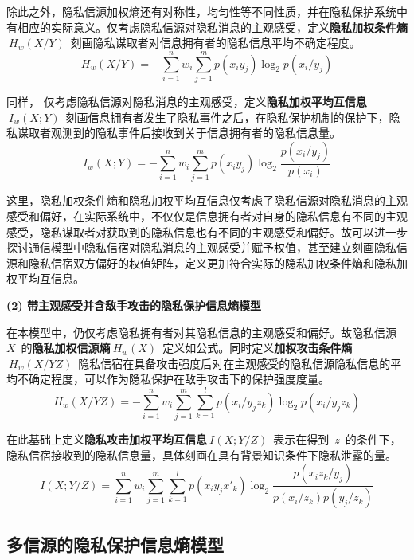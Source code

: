除此之外，隐私信源加权熵还有对称性，均匀性等不同性质，并在隐私保护系统中有相应的实际意义。仅考虑隐私信源对隐私消息的主观感受，定义\textbf{隐私加权条件熵}$~H_{w}(X/Y)$~刻画隐私谋取者对信息拥有者的隐私信息平均不确定程度。
\begin{equation}
H_{w}(X/Y)=-\sum_{i=1}^{n}w_{i}\sum_{j=1}^{m}p(x_{i}y_{j})\log_{2}p(x_{i}/y_{j})
\end{equation}

同样， 仅考虑隐私信源对隐私消息的主观感受，定义\textbf{隐私加权平均互信息}$~I_{w}(X;Y)$~刻画信息拥有者发生了隐私事件之后，在隐私保护机制的保护下，隐私谋取者观测到的隐私事件后接收到关于信息拥有者的隐私信息量。
\begin{equation}
I_{w}(X;Y)=-\sum_{i=1}^{n}w_{i}\sum_{j=1}^{m}p(x_{i}y_{j})\log_{2}\frac{p(x_{i}/y_{j})}{p(x_{i})}
\end{equation}

这里，隐私加权条件熵和隐私加权平均互信息仅考虑了隐私信源对隐私消息的主观感受和偏好，在实际系统中，不仅仅是信息拥有者对自身的隐私信息有不同的主观感受，隐私谋取者对获取到的隐私信息也有不同的主观感受和偏好。故可以进一步探讨通信模型中隐私信宿对隐私消息的主观感受并赋予权值，甚至建立刻画隐私信源和隐私信宿双方偏好的权值矩阵，定义更加符合实际的隐私加权条件熵和隐私加权平均互信息。

\textbf{(2) 带主观感受并含敌手攻击的隐私保护信息熵模型}

在本模型中，仍仅考虑隐私拥有者对其隐私信息的主观感受和偏好。故隐私信源~$X$~的\textbf{隐私加权信源熵}$~H_{w}(X)$~定义如公式。同时定义\textbf{加权攻击条件熵}$~H_{w}(X/YZ)$~隐私信宿在具备攻击强度后对在主观感受的隐私信源隐私信息的平均不确定程度，可以作为隐私保护在敌手攻击下的保护强度度量。
\begin{equation}
H_{w}(X/YZ)=-\sum_{i=1}^{n}w_{i}\sum_{j=1}^{m}\sum_{k=1}^{l}p(x_{i}/y_{j}z_{k})\log_{2}p(x_{i}/y_{j}z_{k})
\end{equation}

在此基础上定义\textbf{隐私攻击加权平均互信息}$~I(X;Y/Z)$~表示在得到~$z$~的条件下，隐私信宿接收到的隐私信息量，具体刻画在具有背景知识条件下隐私泄露的量。
\begin{equation}
I(X;Y/Z)=\sum_{i=1}^{n}w_{i}\sum_{j=1}^{m}\sum_{k=1}^{l}p(x_{i}y_{j}{x}'_{k})\log_{2}\frac{p(x_{i}z_{k}/y_{j})}{p(x_{i}/z_{k})p(y_{j}/z_{k})}
\end{equation}

\subsection{多信源的隐私保护信息熵模型}

